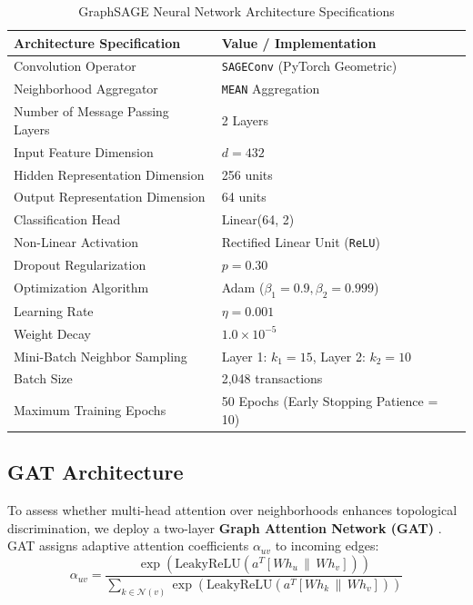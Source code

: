 \documentclass[11pt,a4paper]{report}
\begin{document}
\begin{table}[H]
\centering
\caption{GraphSAGE Neural Network Architecture Specifications}
\label{tab:graphsage_arch}
\begin{tabular}{ll}
\toprule
\textbf{Architecture Specification} & \textbf{Value / Implementation} \\
\midrule
Convolution Operator & \texttt{SAGEConv} (PyTorch Geometric) \\
Neighborhood Aggregator & \texttt{MEAN} Aggregation \\
Number of Message Passing Layers & 2 Layers \\
Input Feature Dimension & $d = 432$ \\
Hidden Representation Dimension & 256 units \\
Output Representation Dimension & 64 units \\
Classification Head & Linear(64, 2) \\
Non-Linear Activation & Rectified Linear Unit (\texttt{ReLU}) \\
Dropout Regularization & $p = 0.30$ \\
Optimization Algorithm & Adam ($\beta_1 = 0.9, \beta_2 = 0.999$) \\
Learning Rate & $\eta = 0.001$ \\
Weight Decay & $1.0 \times 10^{-5}$ \\
Mini-Batch Neighbor Sampling & Layer 1: $k_1 = 15$, Layer 2: $k_2 = 10$ \\
Batch Size & 2,048 transactions \\
Maximum Training Epochs & 50 Epochs (Early Stopping Patience = 10) \\
\bottomrule
\end{tabular}
\end{table}

\subsection{GAT Architecture}
To assess whether multi-head attention over neighborhoods enhances topological discrimination, we deploy a two-layer \textbf{Graph Attention Network (GAT)} \cite{velickovic2018graph}. GAT assigns adaptive attention coefficients $\alpha_{uv}$ to incoming edges:
\begin{equation}
\alpha_{uv} = \frac{\exp\left(\text{LeakyReLU}\left(a^T [W h_u \,\|\, W h_v]\right)\right)}{\sum_{k \in \mathcal{N}(v)} \exp\left(\text{LeakyReLU}\left(a^T [W h_k \,\|\, W h_v]\right)\right)}
\end{equation}
\end{document}
